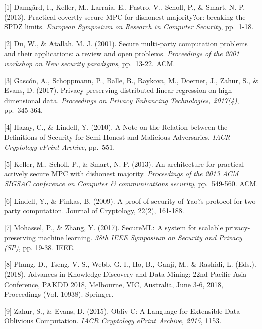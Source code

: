 \documentclass{article}
\begin{document}
\small

[1] Damg\aa rd, I., Keller, M., Larraia, E., Pastro, V., Scholl, P., \& Smart, N. P. (2013). Practical covertly secure MPC for dishonest majority?or: breaking the SPDZ limits. {\it European Symposium on Research in Computer Security}, pp.\ 1-18.

[2] Du, W., \& Atallah, M. J. (2001). Secure multi-party computation problems and their applications: a review and open problems. {\it Proceedings of the 2001 workshop on New security paradigms}, pp.\ 13-22. ACM.

[3] Gasc\'{o}n, A., Schoppmann, P., Balle, B., Raykova, M., Doerner, J., Zahur, S., \& Evans, D. (2017). Privacy-preserving distributed linear regression on high-dimensional data. {\it Proceedings on Privacy Enhancing Technologies, 2017(4)}, pp.\ 345-364.

[4] Hazay, C., \& Lindell, Y. (2010). A Note on the Relation between the Definitions of Security for Semi-Honest and Malicious Adversaries. {\it IACR Cryptology ePrint Archive}, pp.\ 551.

[5] Keller, M., Scholl, P., \& Smart, N. P. (2013). An architecture for practical actively secure MPC with dishonest majority. {\it Proceedings of the 2013 ACM SIGSAC conference on Computer \& communications security}, pp.\ 549-560. ACM.

[6] Lindell, Y., \& Pinkas, B. (2009). A proof of security of Yao?s protocol for two-party computation. Journal of Cryptology, 22(2), 161-188.

[7] Mohassel, P., \& Zhang, Y. (2017). SecureML: A system for scalable privacy-preserving machine learning. {\it 38th IEEE Symposium on Security and Privacy (SP)}, pp. 19-38. IEEE.

[8] Phung, D., Tseng, V. S., Webb, G. I., Ho, B., Ganji, M., \& Rashidi, L. (Eds.). (2018). Advances in Knowledge Discovery and Data Mining: 22nd Pacific-Asia Conference, PAKDD 2018, Melbourne, VIC, Australia, June 3-6, 2018, Proceedings (Vol. 10938). Springer.

[9] Zahur, S., \& Evans, D. (2015). Obliv-C: A Language for Extensible Data-Oblivious Computation. {\it IACR Cryptology ePrint Archive, 2015}, 1153.
\end{document}
